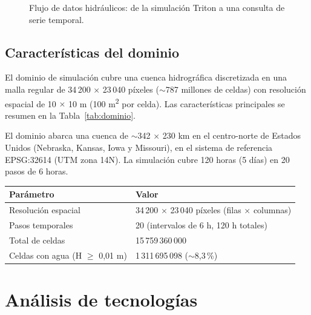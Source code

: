 \begin{figure}[ht]
\caption{Flujo de datos hidráulicos: de la simulación Triton a una consulta de serie temporal.}
\label{fig:hidraulica-datos}
\end{figure}

\section{Características del dominio}\label{caracteristicas-del-dominio}

El dominio de simulación cubre una cuenca hidrográfica discretizada en una malla regular de 34\,200 $\times$ 23\,040 píxeles ($\sim$787 millones de celdas) con resolución espacial de 10 $\times$ 10 m (100 m\textsuperscript{2} por celda). Las características principales se resumen en la Tabla~\ref{tab:dominio}.

El dominio abarca una cuenca de $\sim$342 $\times$ 230 km en el centro-norte de Estados Unidos (Nebraska, Kansas, Iowa y Missouri), en el sistema de referencia EPSG:32614 (UTM zona 14N). La simulación cubre 120 horas (5 días) en 20 pasos de 6 horas.


\noindent\begin{minipage}{\textwidth}
\begin{tabularx}{\textwidth}{>{\raggedright\arraybackslash}p{5.5cm}L}
\toprule
\textbf{Parámetro} & \textbf{Valor} \\
\midrule
Resolución espacial & 34\,200 $\times$ 23\,040 píxeles (filas $\times$ columnas) \\
Pasos temporales & 20 (intervalos de 6 h, 120 h totales) \\
Total de celdas & 15\,759\,360\,000 \\
Celdas con agua (H $\geq$ 0,01 m) & 1\,311\,695\,098 ($\sim$8,3\,\%) \\
\bottomrule
\end{tabularx}
\captionsetup{hypcap=false}
\label{tab:dominio}
\end{minipage}


\chapter{Análisis de tecnologías}\label{analisis-de-tecnologias}

